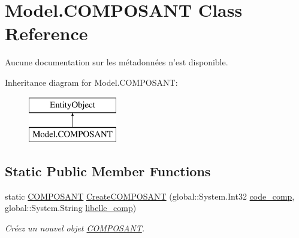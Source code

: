 \hypertarget{class_model_1_1_c_o_m_p_o_s_a_n_t}{\section{Model.\-C\-O\-M\-P\-O\-S\-A\-N\-T Class Reference}
\label{class_model_1_1_c_o_m_p_o_s_a_n_t}
}


Aucune documentation sur les métadonnées n'est disponible.  


Inheritance diagram for Model.\-C\-O\-M\-P\-O\-S\-A\-N\-T\-:\begin{figure}[H]
\begin{center}
\leavevmode
\includegraphics[height=2.000000cm]{class_model_1_1_c_o_m_p_o_s_a_n_t}
\end{center}
\end{figure}
\subsection*{Static Public Member Functions}
\begin{DoxyCompactItemize}
\item 
static \hyperlink{class_model_1_1_c_o_m_p_o_s_a_n_t}{C\-O\-M\-P\-O\-S\-A\-N\-T} \hyperlink{class_model_1_1_c_o_m_p_o_s_a_n_t_aad0d682b743b1d72a3ed03a373e07f72}{Create\-C\-O\-M\-P\-O\-S\-A\-N\-T} (global\-::\-System.\-Int32 \hyperlink{class_model_1_1_c_o_m_p_o_s_a_n_t_a29f8a5ee13f9d217125a207dcf378c2c}{code\-\_\-comp}, global\-::\-System.\-String \hyperlink{class_model_1_1_c_o_m_p_o_s_a_n_t_a238618dd950cff9c1d8cced54be482bb}{libelle\-\_\-comp})
\begin{DoxyCompactList}\small\item\em Créez un nouvel objet \hyperlink{class_model_1_1_c_o_m_p_o_s_a_n_t}{C\-O\-M\-P\-O\-S\-A\-N\-T}. \end{DoxyCompactList}\end{DoxyCompactItemize}

